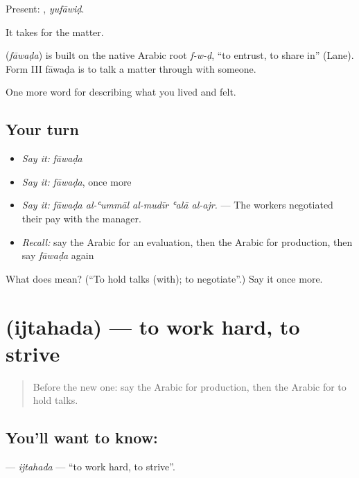 Present: , \emph{yufāwiḍ}.

It takes  for the matter.

\begin{cousinweb}
\textbf{} (\emph{fāwaḍa}) is built on the native Arabic root \emph{f-w-ḍ}, \textquotedblleft{}to entrust, to share in\textquotedblright{} (Lane). Form III fāwaḍa is to talk a matter through with someone.
\end{cousinweb}

\begin{grammarlens}[title={What you've built}]
One more word for describing what you lived and felt.
\end{grammarlens}

\subsection*{Your turn}
\begin{itemize}
\raggedright
  \item \emph{Say it:} \emph{fāwaḍa}
  \item \emph{Say it:} \emph{fāwaḍa}, once more
  \item \emph{Say it:} \emph{fāwaḍa al-ʿummāl al-mudīr ʿalā al-ajr.} — The workers negotiated their pay with the manager.
  \item \emph{Recall:} say the Arabic for an evaluation, then the Arabic for production, then say \emph{fāwaḍa} again
\end{itemize}

\begin{tcolorbox}[breakable,colback=teal!4,colframe=teal!35!black,title={Before you move on}]
What does  mean? (\textquotedblleft{}To hold talks (with); to negotiate\textquotedblright{}.) Say it once more.
\end{tcolorbox}
\section[\texorpdfstring{\ar{اجتهد} (ijtahada)}{اجتهد (ijtahada)}]{ (ijtahada) — to work hard, to strive}

\label{lesson:AR-C524-ijtahada}



\begin{quote}
Before the new one: say the Arabic for production, then the Arabic for to hold talks.
\end{quote}

\subsection*{You'll want to know: }
\textbf{} — \emph{ijtahada} — \textquotedblleft{}to work hard, to strive\textquotedblright{}.

